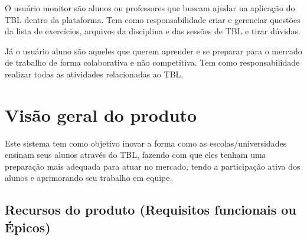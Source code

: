 O usuário monitor são alunos ou professores que buscam ajudar na aplicação do TBL dentro da plataforma. Tem como responsabilidade criar e gerenciar questões da lista de exercícios, arquivos da disciplina e das sessões de TBL e tirar dúvidas.

Já o usuário aluno são aqueles que querem aprender e se preparar para o mercado de trabalho de forma colaborativa e não competitiva. Tem como responsabilidade realizar todas as atividades relacionadas ao TBL.

\section{Visão geral do produto}

Este sistema tem como objetivo inovar a forma como as escolas/universidades ensinam seus alunos através do TBL, fazendo com que eles tenham uma preparação mais adequada para atuar no mercado, tendo a participação ativa dos alunos e aprimorando seu trabalho em equipe.

\subsection{Recursos do produto (Requisitos funcionais ou Épicos)}


